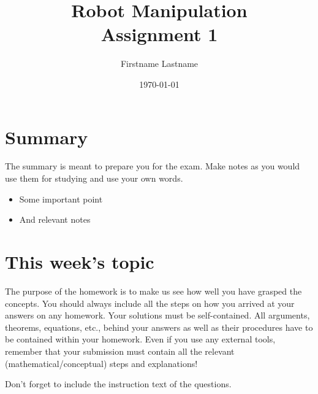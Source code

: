 \documentclass[paper=a4, fontsize=11pt]{scrartcl}
\title{
		\usefont{OT1}{bch}{b}{n}
		\normalfont \Large Robot Manipulation \\
		\huge Assignment 1 \\ %
}
\author{\normalfont \normalsize Firstname Lastname %
		\\[-3pt] }
\date{\normalsize \today}
\begin{document}
\maketitle

 
\section{Summary}
The summary is meant to prepare you for the exam. Make notes as you would use them for studying and use your own words. 
\begin{itemize}
	\item Some important point
	\item And relevant notes
\end{itemize}

\section{This week's topic}

The purpose of the homework is to make us see how well you have grasped the concepts. You should always include all the steps on how you arrived at your answers on any homework.
Your solutions must be self-contained. All arguments, theorems, equations, etc., behind your answers as well as their procedures have to be contained within your homework.
Even if you use any external tools, remember that your submission must contain all the relevant (mathematical/conceptual) steps and explanations!  

Don't forget to include the instruction text of the questions.
\end{document}
